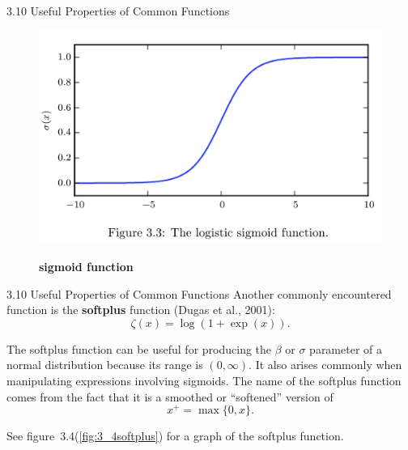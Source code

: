 \begin{frame}{3.10 Useful Properties of Common Functions}
    \begin{figure}
        \centering
        \includegraphics[scale=0.20]{images/3-3-sigmoid.png}
        \label{fig:3_3sigmoid}
        \caption{\textbf{sigmoid function}}
    \end{figure}
\end{frame}

\begin{frame}{3.10 Useful Properties of Common Functions}
    \justifying
    Another commonly encountered function is the \textbf{softplus} function (Dugas et al., 2001):
    \begin{equation}
        \zeta(x) = \log(1 + \exp(x)).
        \label{eq:3_31}
    \end{equation}
    
    The softplus function can be useful for producing the $\beta$ or $\sigma$ parameter of a normal distribution because its range is $(0, \infty)$. It also arises commonly when manipulating expressions involving sigmoids. The name of the softplus function comes from the fact that it is a smoothed or ``softened'' version of
    \begin{equation}
        x^{+} = \max\{0, x\}.
        \label{eq:3_32}
    \end{equation}
    
    See figure~3.4(\ref{fig:3_4softplus}) for a graph of the softplus function.
\end{frame}

